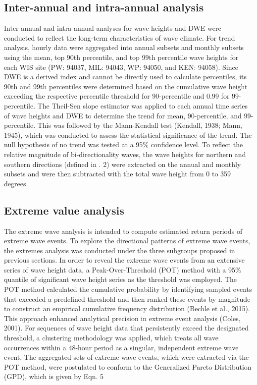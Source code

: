 \subsection{Inter-annual and intra-annual analysis}
\label{c3_Inter-annual and intra-annual analysis}
Inter-annual and intra-annual analyses for wave heights and DWE were conducted to reflect the long-term characteristics of wave climate. For trend analysis, hourly data were aggregated into annual subsets and monthly subsets using the mean, top 90th percentile, and top 99th percentile wave heights for each WIS site (PW: 94037, MIL: 94043, WP: 94050, and KEN: 94058). Since DWE is a derived index and cannot be directly used to calculate percentiles, its 90th and 99th percentiles were determined based on the cumulative wave height exceeding the respective percentile threshold for 90-percentile and 0.99 for 99-percentile. The Theil-Sen slope estimator was applied to each annual time series of wave heights and DWE to determine the trend for mean, 90-percentile, and 99-percentile. This was followed by the Mann-Kendall test (Kendall, 1938; Mann, 1945), which was conducted to assess the statistical significance of the trend. The null hypothesis of no trend was tested at a 95\% confidence level. To reflect the relative magnitude of bi-directionality waves, the wave heights for northern and southern directions (defined in . 2) were extracted on the annual and monthly subsets and were then subtracted with the total wave height from 0 to 359 degrees.

\subsection{Extreme value analysis}
\label{c3_Extreme value analysis}
The extreme wave analysis is intended to compute estimated return periods of extreme wave events. To explore the directional patterns of extreme wave events, the extremes analysis was conducted under the three subgroups proposed in previous sections. In order to reveal the extreme wave events from an extensive series of wave height data, a Peak-Over-Threshold (POT) method with a 95\% quantile of significant wave height series as the threshold was employed. The POT method calculated the cumulative probability by identifying sampled events that exceeded a predefined threshold and then ranked these events by magnitude to construct an empirical cumulative frequency distribution (Bechle et al., 2015). This approach enhanced analytical precision in extreme event analysis (Coles, 2001). For sequences of wave height data that persistently exceed the designated threshold, a clustering methodology was applied, which treats all wave occurrences within a 48-hour period as a singular, independent extreme wave event. The aggregated sets of extreme wave events, which were extracted via the POT method, were postulated to conform to the Generalized Pareto Distribution (GPD), which is given by Eqn. 5

